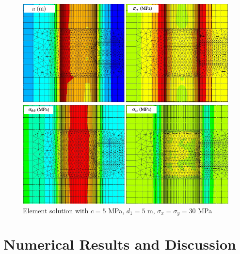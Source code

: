 \documentclass[a4paper,fleqn]{cas-sc}
\begin{document}
\begin{figure}[h!]
	\centering
	\includegraphics[scale=1]{MA_FIG2.pdf}
	\caption{Element solution with $c=5$ MPa, $d_1=5$ m, $\sigma_x = \sigma_y = 30$ MPa}
	\label{MA_FIG2}
\end{figure}
\FloatBarrier

\section{Numerical Results and Discussion}\label{}
\end{document}

